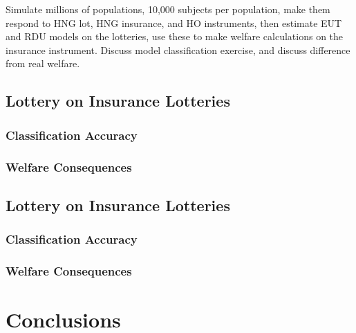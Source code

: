 \documentclass[../main.tex]{subfiles}
\begin{document}
	Simulate millions of populations, 10,000 subjects per population, make them respond to HNG lot, HNG insurance, and HO instruments, then estimate EUT and RDU models on the lotteries, use these to make welfare calculations on the insurance instrument.
	Discuss model classification exercise, and discuss difference from real welfare.

	\subsection{ \texorpdfstring{\textcite{Harrison2016}}{Harrison and Ng (2016)} Lottery on \texorpdfstring{\textcite{Harrison2016}}{Harrison and Ng (2016)} Insurance Lotteries   }
		\subsubsection{Classification Accuracy}
		\subsubsection{Welfare Consequences}
	\subsection{ \texorpdfstring{\textcite{Hey1994}}{Hey and Orme (1994)} Lottery on \texorpdfstring{\textcite{Harrison2016}}{Harrison and Ng (2016)} Insurance Lotteries   }
		\subsubsection{Classification Accuracy}
		\subsubsection{Welfare Consequences}
\section{Conclusions}

\newpage

\printbibliography[segment=4, heading=subbibliography]
\end{document}
